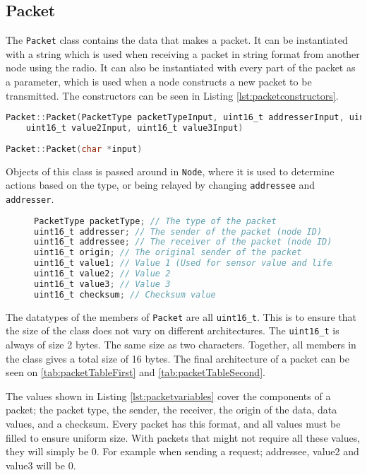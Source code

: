 \subsection{Packet}
The \texttt{Packet} class contains the data that makes a packet. It can be instantiated with a string which is used when receiving a packet in string format from another node using the radio. It can also be instantiated with every part of the packet as a parameter, which is used when a node constructs a new packet to be transmitted. The constructors can be seen in Listing \ref{lst:packetconstructors}.
\begin{lstlisting}[language=C,label={lst:packetconstructors},caption={Packet constructors}]
Packet::Packet(PacketType packetTypeInput, uint16_t addresserInput, uint16_t addresseeInput, uint16_t originInput, uint16_t value1Input,
	uint16_t value2Input, uint16_t value3Input)
	
Packet::Packet(char *input)
\end{lstlisting}

Objects of this class is passed around in \texttt{Node}, where it is used to determine actions based on the type, or being relayed by changing \texttt{addressee} and \texttt{addresser}.

\begin{figure}
\begin{lstlisting}[language=C,label={lst:packetvariables},caption={Packet variables}]
PacketType packetType; // The type of the packet
uint16_t addresser; // The sender of the packet (node ID)
uint16_t addressee; // The receiver of the packet (node ID)
uint16_t origin; // The original sender of the packet
uint16_t value1; // Value 1 (Used for sensor value and lifespan)
uint16_t value2; // Value 2
uint16_t value3; // Value 3
uint16_t checksum; // Checksum value
\end{lstlisting}
\end{figure}
The datatypes of the members of \texttt{Packet} are all \texttt{uint16\_t}. This is to ensure that the size of the class does not vary on different architectures. The \texttt{uint16\_t} is always of size 2 bytes. The same size as two characters. Together, all members in the class gives a total size of 16 bytes. The final architecture of a packet can be seen on \ref{tab:packetTableFirst} and \ref{tab:packetTableSecond}.

The values shown in Listing \ref{lst:packetvariables} cover the components of a packet; the packet type, the sender, the receiver, the origin of the data, data values, and a checksum.
Every packet has this format, and all values must be filled to ensure uniform size. With packets that might not require all these values, they will simply be 0. For example when sending a request; addressee, value2 and value3 will be 0.

